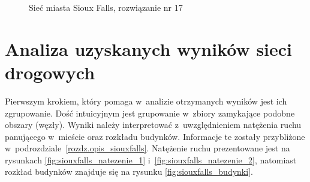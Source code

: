 \documentclass[twoside,12pt]{report}
\begin{document}
\begin{figure}[htbp]
\centering
{}
\caption{Sieć miasta Sioux Falls, rozwiązanie nr 17}
\label{fig:sioux17}
\end{figure}

\clearpage
\section{Analiza uzyskanych wyników sieci drogowych}\label{rozdz.analiza_uzyskanych_wynikow}
Pierwszym krokiem, który pomaga w~analizie otrzymanych wyników jest ich zgrupowanie. Dość intuicyjnym jest grupowanie w~zbiory zamykające podobne obszary (węzły). Wyniki należy interpretować z~uwzględnieniem natężenia ruchu panującego w~mieście oraz rozkładu budynków. Informacje te zostały przybliżone w~podrozdziale~\ref{rozdz.opis_siouxfalls}. Natężenie ruchu prezentowane jest na rysunkach \ref{fig:siouxfalls_natezenie_1} i~\ref{fig:siouxfalls_natezenie_2}, natomiast rozkład budynków znajduje się na rysunku \ref{fig:siouxfalls_budynki}.
\end{document}
